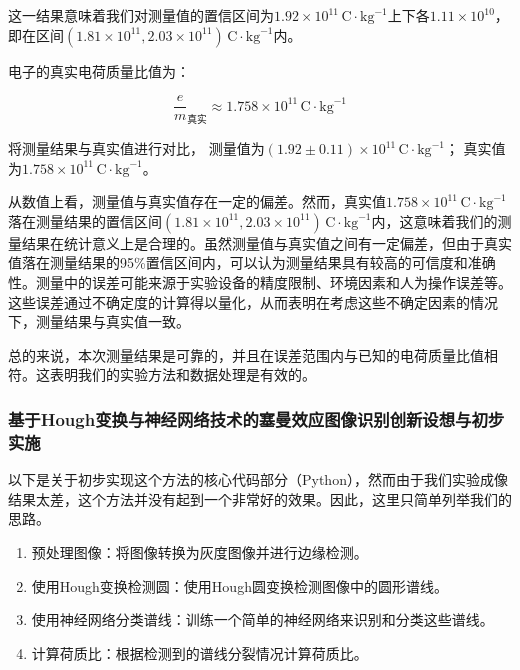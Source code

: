 \documentclass[dvipsnames, svgnames,a4paper,11pt]{article}
\begin{document}
\begin{enumerate}
		这一结果意味着我们对测量值的置信区间为$1.92 \times 10^{11} \, \text{C} \cdot \text{kg}^{-1}$上下各$1.11 \times 10^{10}$，即在区间$(1.81 \times 10^{11}, 2.03 \times 10^{11}) \, \text{C} \cdot \text{kg}^{-1}$内。
		
		电子的真实电荷质量比值为：
		
		\[
		\frac{e}{m}_{\text{真实}} \approx 1.758 \times 10^{11} \, \text{C} \cdot \text{kg}^{-1}
		\]
		
		将测量结果与真实值进行对比，
		测量值为$(1.92 \pm 0.11) \times 10^{11} \, \text{C} \cdot \text{kg}^{-1}$；
		真实值为$1.758 \times 10^{11} \, \text{C} \cdot \text{kg}^{-1}$。
		
		从数值上看，测量值与真实值存在一定的偏差。然而，真实值$1.758 \times 10^{11} \, \text{C} \cdot \text{kg}^{-1}$落在测量结果的置信区间$(1.81 \times 10^{11}, 2.03 \times 10^{11}) \, \text{C} \cdot \text{kg}^{-1}$内，这意味着我们的测量结果在统计意义上是合理的。虽然测量值与真实值之间有一定偏差，但由于真实值落在测量结果的95\%置信区间内，可以认为测量结果具有较高的可信度和准确性。测量中的误差可能来源于实验设备的精度限制、环境因素和人为操作误差等。这些误差通过不确定度的计算得以量化，从而表明在考虑这些不确定因素的情况下，测量结果与真实值一致。
		
		总的来说，本次测量结果是可靠的，并且在误差范围内与已知的电荷质量比值相符。这表明我们的实验方法和数据处理是有效的。
	\end{enumerate}
	
	
	\subsubsection{基于Hough变换与神经网络技术的塞曼效应图像识别创新设想与初步实施}
	以下是关于初步实现这个方法的核心代码部分（Python），然而由于我们实验成像结果太差，这个方法并没有起到一个非常好的效果。因此，这里只简单列举我们的思路。
	\begin{enumerate}
		\item 预处理图像：将图像转换为灰度图像并进行边缘检测。
		\item 使用Hough变换检测圆：使用Hough圆变换检测图像中的圆形谱线。
		\item 使用神经网络分类谱线：训练一个简单的神经网络来识别和分类这些谱线。
		\item 计算荷质比：根据检测到的谱线分裂情况计算荷质比。
	\end{enumerate}
	
\end{document}
